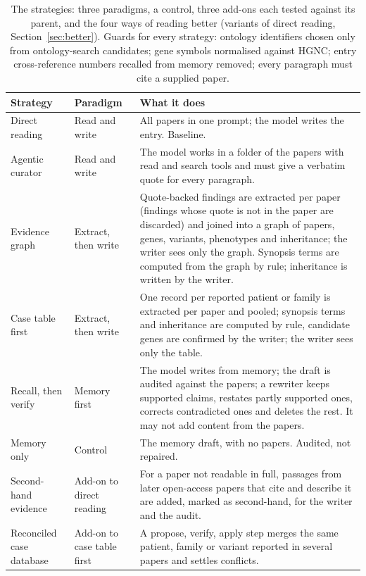 \documentclass{article} %
\begin{document}
\begin{table}[!htbp]
\caption{The strategies: three paradigms, a control, three add-ons each tested against its parent, and the four ways of reading better (variants of direct reading, Section~\ref{sec:better}). Guards for every strategy: ontology identifiers chosen only from ontology-search candidates; gene symbols normalised against HGNC; entry cross-reference numbers recalled from memory removed; every paragraph must cite a supplied paper.}
\label{tab:app_strategies}
\scriptsize
\begin{tabularx}{\linewidth}{>{\raggedright\arraybackslash}p{2.4cm}>{\raggedright\arraybackslash}p{2.6cm}>{\raggedright\arraybackslash}X}
\toprule
Strategy & Paradigm & What it does \\
\midrule
Direct reading & Read and write & All papers in one prompt; the model writes the entry. Baseline. \\
Agentic curator & Read and write & The model works in a folder of the papers with read and search tools and must give a verbatim quote for every paragraph. \\
Evidence graph & Extract, then write & Quote-backed findings are extracted per paper (findings whose quote is not in the paper are discarded) and joined into a graph of papers, genes, variants, phenotypes and inheritance; the writer sees only the graph. Synopsis terms are computed from the graph by rule; inheritance is written by the writer. \\
Case table first & Extract, then write & One record per reported patient or family is extracted per paper and pooled; synopsis terms and inheritance are computed by rule, candidate genes are confirmed by the writer; the writer sees only the table. \\
Recall, then verify & Memory first & The model writes from memory; the draft is audited against the papers; a rewriter keeps supported claims, restates partly supported ones, corrects contradicted ones and deletes the rest. It may not add content from the papers. \\
Memory only & Control & The memory draft, with no papers. Audited, not repaired. \\
Second-hand evidence & Add-on to direct reading & For a paper not readable in full, passages from later open-access papers that cite and describe it are added, marked as second-hand, for the writer and the audit. \\
Reconciled case database & Add-on to case table first & A propose, verify, apply step merges the same patient, family or variant reported in several papers and settles conflicts. \\

\end{tabularx}
\end{table}
\end{document}
